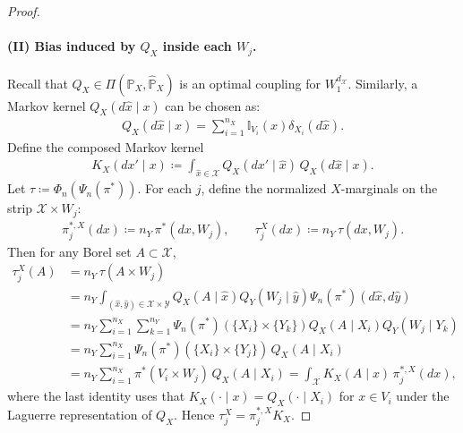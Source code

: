 \documentclass{article}
\theoremstyle{plain}
\theoremstyle{definition}
\theoremstyle{remark}
\begin{document}
\begin{proof}
	\paragraph{(II) Bias induced by $Q_X$ inside each $W_j$.}
	Recall that $Q_X\in\Pi(\mathbb{P}_X,\hat{\mathbb{P}}_X)$ is an optimal coupling for $W_1^{d_{\mathcal{X}}}$. Similarly, a Markov kernel $Q_X(d\hat{x}\mid x)$ can be chosen as:
	\begin{align*}
		Q_X(d\hat{x} \mid x) = \sum_{i=1}^{n_X} \mathbb{I}_{V_i}(x) \delta_{X_i}(d\hat{x}) .
	\end{align*}
	Define the composed Markov kernel
	\begin{align*}
		K_X(dx'\mid x)\coloneqq \int_{\hat{x}\in\mathcal{X}} Q_X(dx'\mid \hat{x})\,Q_X(d\hat{x}\mid x).
	\end{align*}
	Let $\tau\coloneqq \Phi_n(\Psi_n(\pi^*))$.
	For each $j$, define the normalized $X$-marginals on the strip $\mathcal{X}\times W_j$:
	\begin{align*}
		\pi^{*,X}_j(dx)\coloneqq n_Y\,\pi^*(dx,W_j),
		\qquad
		\tau^X_j(dx)\coloneqq n_Y\,\tau(dx,W_j).
	\end{align*}
	Then for any Borel set $A\subset\mathcal{X}$,
	\begin{align*}
		\tau^X_j(A)
		&= n_Y\,\tau(A\times W_j) \\
		&= n_Y\int_{(\hat{x},\hat{y}) \in \mathcal{X}\times\mathcal{Y}} Q_X(A \mid \hat{x})Q_Y(W_j \mid \hat{y})\Psi_n(\pi^*)(d\hat{x},d\hat{y}) \\
		&= n_Y\sum_{i=1}^{n_X}\sum_{k=1}^{n_Y} \Psi_n(\pi^*)(\{X_i\} \times \{Y_k\}) Q_X(A \mid X_i) Q_Y(W_j \mid Y_k) \\
		&= n_Y\sum_{i=1}^{n_X}\Psi_n(\pi^*)(\{X_i\} \times \{Y_j\})\,Q_X(A\mid X_i) \\
		&= n_Y\sum_{i=1}^{n_X}\pi^*(V_i\times W_j)\,Q_X(A\mid X_i)
		= \int_{\mathcal{X}} K_X(A\mid x)\,\pi^{*,X}_j(dx),
	\end{align*}
	where the last identity uses that $K_X(\cdot\mid x)=Q_X(\cdot\mid X_i)$ for $x\in V_i$ under the Laguerre representation of $Q_X$.
	Hence $\tau^X_j = \pi^{*,X}_j K_X$.
	

\end{proof}
\end{document}
